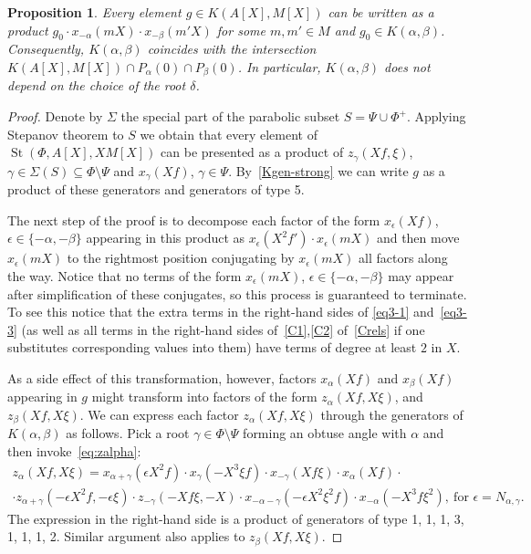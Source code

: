 \documentclass[oneside, 8pt]{amsart}
\newtheorem{prop}[lemma]{Proposition}
\theoremstyle{remark}
\theoremstyle{definition}
\numberwithin{lemma}{section}
\numberwithin{prop}{section}
\numberwithin{corollary}{section}
\DeclareMathOperator{\St}{St}
\numberwithin{equation}{section}
\begin{document}
\begin{prop} \label{K-a-b} Every element $g \in K(A[X], M[X])$ can be written as a product $g_0 \cdot x_{-\alpha}(mX) \cdot x_{-\beta}(m'X)$ for some $m, m' \in M$ and $g_0 \in K(\alpha, \beta)$. 
Consequently, $K(\alpha, \beta)$ coincides with the intersection $K(A[X], M[X]) \cap P_\alpha(0) \cap P_\beta(0)$. 
In particular, $K(\alpha, \beta)$ does not depend on the choice of the root $\delta$. \end{prop}
\begin{proof} Denote by $\Sigma$ the special part of the parabolic subset $S = \Psi \cup \Phi^+$. 
Applying Stepanov theorem to $S$ we obtain that every element of $\St(\Phi, A[X], XM[X])$ can be presented as a product of $z_\gamma(Xf, \xi)$, 
$\gamma \in \Sigma(S) \subseteq \Phi\setminus \Psi$ and $x_\gamma(Xf)$, $\gamma \in \Psi$. By~\cref{Kgen-strong} we can write $g$ as a product of these generators and generators of type 5.
  
 The next step of the proof is to decompose each factor of the form $x_{\epsilon}(Xf)$, $\epsilon \in \{-\alpha,-\beta\}$ appearing in this product as
 $x_{\epsilon}(X^2f') \cdot x_{\epsilon}(mX)$ and then move $x_{\epsilon}(mX)$ to the rightmost position conjugating by $x_{\epsilon}(mX)$ all factors along the way.
 Notice that no terms of the form $x_{\epsilon}(mX)$, $\epsilon \in \{ -\alpha, -\beta \}$ may appear after simplification of these conjugates, so this process is guaranteed to terminate.
 To see this notice that the extra terms in the right-hand sides of \eqref{eq3-1} and~\eqref{eq3-3} 
 (as well as all terms in the right-hand sides of~\eqref{C1},\eqref{C2} of~\cref{Crels} if one substitutes corresponding values into them) have terms of degree at least $2$ in $X$. 
  
 As a side effect of this transformation, however, factors $x_\alpha(Xf)$ and $x_\beta(Xf)$ appearing in $g$ might transform into factors of the form $z_\alpha(Xf, X\xi)$, and $z_\beta(Xf, X\xi)$. We can express each factor $z_\alpha(Xf, X\xi)$ through the generators of $K(\alpha, \beta)$ as follows. Pick a root $\gamma \in \Phi\setminus \Psi$ forming an obtuse angle with $\alpha$ and then invoke~\eqref{eq:zalpha}:
 \begin{multline} z_\alpha(Xf, X\xi) = x_{\alpha+\gamma}(\epsilon X^2f) \cdot x_{\gamma}(-X^3 \xi f) \cdot x_{-\gamma}(Xf\xi) \cdot x_\alpha(Xf) \cdot \\ 
 \cdot z_{\alpha+\gamma}(-\epsilon X^2 f, -\epsilon \xi) \cdot z_{-\gamma}(-Xf\xi, -X) \cdot x_{-\alpha-\gamma}(-\epsilon X^2\xi^2 f) \cdot x_{-\alpha}(-X^3 f \xi^2),\ \text{for } \epsilon = N_{\alpha, \gamma}. \end{multline}
 The expression in the right-hand side is a product of generators of type 1, 1, 1, 3, 1, 1, 1, 2. Similar argument also applies to $z_\beta(Xf, X\xi)$.  
 

\end{proof}
\end{document}
